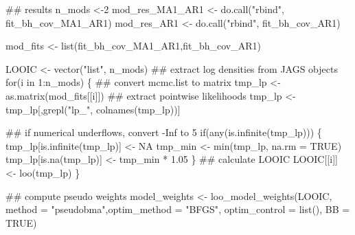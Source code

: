 \documentclass[
  11pt,
]{article}
\newenvironment{Shaded}{}{}
\newcommand{\CommentTok}[1]{\textcolor[rgb]{0.00,0.50,0.00}{#1}}
\newcommand{\ControlFlowTok}[1]{\textcolor[rgb]{0.00,0.00,1.00}{#1}}
\newcommand{\DataTypeTok}[1]{#1}
\newcommand{\DecValTok}[1]{#1}
\newcommand{\FloatTok}[1]{#1}
\newcommand{\KeywordTok}[1]{\textcolor[rgb]{0.00,0.00,1.00}{#1}}
\newcommand{\NormalTok}[1]{#1}
\newcommand{\OperatorTok}[1]{#1}
\newcommand{\OtherTok}[1]{\textcolor[rgb]{1.00,0.25,0.00}{#1}}
\newcommand{\StringTok}[1]{\textcolor[rgb]{0.00,0.50,0.50}{#1}}
\begin{document}
\begin{Shaded}
\begin{Highlighting}[]
\CommentTok{## results}
\NormalTok{n_mods <-}\DecValTok{2}
\NormalTok{mod_res_MA1_AR1 <-}\StringTok{ }\KeywordTok{do.call}\NormalTok{(}\StringTok{"rbind"}\NormalTok{, fit_bh_cov_MA1_AR1)}
\NormalTok{mod_res_AR1 <-}\StringTok{ }\KeywordTok{do.call}\NormalTok{(}\StringTok{"rbind"}\NormalTok{, fit_bh_cov_AR1)}

\NormalTok{mod_fits <-}\StringTok{ }\KeywordTok{list}\NormalTok{(fit_bh_cov_MA1_AR1,fit_bh_cov_AR1)}

\NormalTok{LOOIC <-}\StringTok{ }\KeywordTok{vector}\NormalTok{(}\StringTok{"list"}\NormalTok{, n_mods)}
\CommentTok{## extract log densities from JAGS objects}
\ControlFlowTok{for}\NormalTok{(i }\ControlFlowTok{in} \DecValTok{1}\OperatorTok{:}\NormalTok{n_mods) \{}
  \CommentTok{## convert mcmc.list to matrix}
\NormalTok{  tmp_lp <-}\StringTok{ }\KeywordTok{as.matrix}\NormalTok{(mod_fits[[i]])}
  \CommentTok{## extract pointwise likelihoods}
\NormalTok{  tmp_lp <-}\StringTok{ }\NormalTok{tmp_lp[,}\KeywordTok{grepl}\NormalTok{(}\StringTok{"lp_"}\NormalTok{, }\KeywordTok{colnames}\NormalTok{(tmp_lp))]}
  \CommentTok{## if numerical underflows, convert -Inf to 5%
  \ControlFlowTok{if}\NormalTok{(}\KeywordTok{any}\NormalTok{(}\KeywordTok{is.infinite}\NormalTok{(tmp_lp))) \{}
\NormalTok{    tmp_lp[}\KeywordTok{is.infinite}\NormalTok{(tmp_lp)] <-}\StringTok{ }\OtherTok{NA}
\NormalTok{    tmp_min <-}\StringTok{ }\KeywordTok{min}\NormalTok{(tmp_lp, }\DataTypeTok{na.rm =} \OtherTok{TRUE}\NormalTok{)}
\NormalTok{    tmp_lp[}\KeywordTok{is.na}\NormalTok{(tmp_lp)] <-}\StringTok{ }\NormalTok{tmp_min }\OperatorTok{*}\StringTok{ }\FloatTok{1.05}
\NormalTok{  \}}
  \CommentTok{## calculate LOOIC}
\NormalTok{  LOOIC[[i]] <-}\StringTok{ }\KeywordTok{loo}\NormalTok{(tmp_lp)}
\NormalTok{\}}

\CommentTok{## compute pseudo weights}
\NormalTok{model_weights <-}\StringTok{ }\KeywordTok{loo_model_weights}\NormalTok{(LOOIC, }\DataTypeTok{method =} \StringTok{"pseudobma"}\NormalTok{,}\DataTypeTok{optim_method =} \StringTok{"BFGS"}\NormalTok{, }\DataTypeTok{optim_control =} \KeywordTok{list}\NormalTok{(), }\DataTypeTok{BB =} \OtherTok{TRUE}\NormalTok{)}

}
\end{Highlighting}
\end{Shaded}
\end{document}

